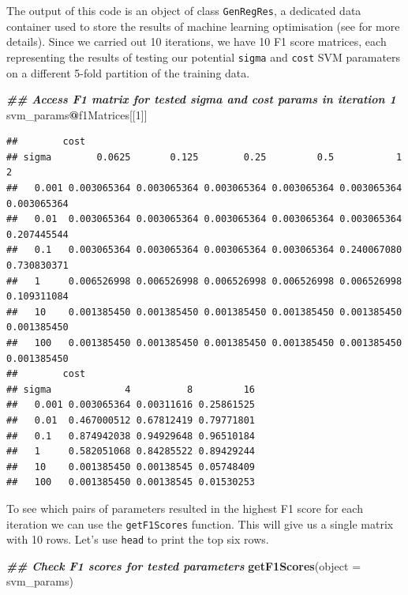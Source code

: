 \documentclass[9pt,a4paper,]{extarticle}
\newenvironment{Shaded}{\begin{snugshade}}{\end{snugshade}}
\newcommand{\AttributeTok}[1]{\textcolor[rgb]{0.13,0.29,0.53}{#1}}
\newcommand{\DecValTok}[1]{\textcolor[rgb]{0.00,0.00,0.81}{#1}}
\newcommand{\DocumentationTok}[1]{\textcolor[rgb]{0.56,0.35,0.01}{\textbf{\textit{#1}}}}
\newcommand{\FunctionTok}[1]{\textcolor[rgb]{0.13,0.29,0.53}{\textbf{#1}}}
\newcommand{\NormalTok}[1]{#1}
\newcommand{\SpecialCharTok}[1]{\textcolor[rgb]{0.81,0.36,0.00}{\textbf{#1}}}
\begin{document}
The output of this code is an object of class \texttt{GenRegRes}, a dedicated data
container used to store the results of machine learning optimisation (see
\citet{Breckels2018} for more details). Since we carried out 10 iterations, we have 10
F1 score matrices, each representing the results of testing our potential
\texttt{sigma} and \texttt{cost} SVM paramaters on a different 5-fold partition of the training
data.

\begin{Shaded}
\begin{Highlighting}[]
\DocumentationTok{\#\# Access F1 matrix for tested sigma and cost params in iteration 1}
\NormalTok{svm\_params}\SpecialCharTok{@}\NormalTok{f1Matrices[[}\DecValTok{1}\NormalTok{]]}
\end{Highlighting}
\end{Shaded}

\begin{verbatim}
##        cost
## sigma        0.0625       0.125        0.25         0.5           1           2
##   0.001 0.003065364 0.003065364 0.003065364 0.003065364 0.003065364 0.003065364
##   0.01  0.003065364 0.003065364 0.003065364 0.003065364 0.003065364 0.207445544
##   0.1   0.003065364 0.003065364 0.003065364 0.003065364 0.240067080 0.730830371
##   1     0.006526998 0.006526998 0.006526998 0.006526998 0.006526998 0.109311084
##   10    0.001385450 0.001385450 0.001385450 0.001385450 0.001385450 0.001385450
##   100   0.001385450 0.001385450 0.001385450 0.001385450 0.001385450 0.001385450
##        cost
## sigma             4          8         16
##   0.001 0.003065364 0.00311616 0.25861525
##   0.01  0.467000512 0.67812419 0.79771801
##   0.1   0.874942038 0.94929648 0.96510184
##   1     0.582051068 0.84285522 0.89429244
##   10    0.001385450 0.00138545 0.05748409
##   100   0.001385450 0.00138545 0.01530253
\end{verbatim}

To see which pairs of parameters resulted in the highest F1 score for each
iteration we can use the \texttt{getF1Scores} function. This will give us a single
matrix with 10 rows. Let's use \texttt{head} to print the top six rows.

\begin{Shaded}
\begin{Highlighting}[]
\DocumentationTok{\#\# Check F1 scores for tested parameters}
\FunctionTok{getF1Scores}\NormalTok{(}\AttributeTok{object =}\NormalTok{ svm\_params)}
\end{Highlighting}
\end{Shaded}
\end{document}
